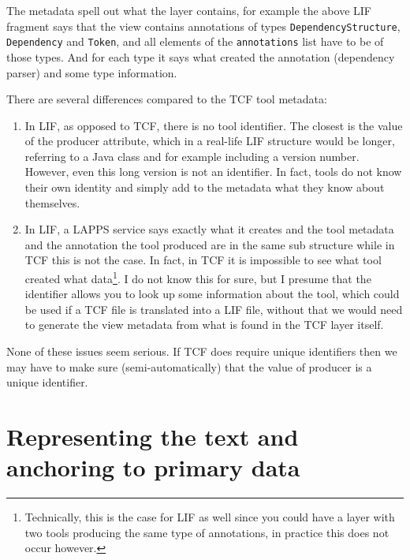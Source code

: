 \documentclass[11pt]{article}
\newcommand{\tag}[1]{{\tt #1}}
\begin{document}
The metadata spell out what the layer contains, for example the above LIF fragment says that the view contains annotations of types \tag{DependencyStructure}, \tag{Dependency} and \tag{Token}, and all elements of the \tag{annotations} list have to be of those types. And for each type it says what created the annotation (dependency parser) and some type information. 

There are several differences compared to the TCF tool metadata:

\begin{enumerate}

\item In LIF, as opposed to TCF, there is no tool identifier. The closest is the value of the producer attribute, which in a real-life LIF structure would be longer, referring to a Java class and for example including a version number. However, even this long version is not an identifier. In fact, tools do not know their own identity and simply add to the metadata what they know about themselves.

\item In LIF, a LAPPS service says exactly what it creates and the tool metadata and the annotation the tool produced are in the same sub structure while in TCF this is not the case. In fact, in TCF it is impossible to see what tool created what data\footnote{Technically, this is the case for LIF as well since you could have a layer with two tools producing the same type of annotations, in practice this does not occur however.}. I do not know this for sure, but I presume that the identifier allows you to look up some information about the tool, which could be used if a TCF file is translated into a LIF file, without that we would need to generate the view metadata from what is found in the TCF layer itself. 

\end{enumerate}

None of these issues seem serious. If TCF does require unique identifiers then we may have to make sure (semi-automatically) that the value of producer is a unique identifier.



\section{Representing the text and anchoring to primary data}
\end{document}
